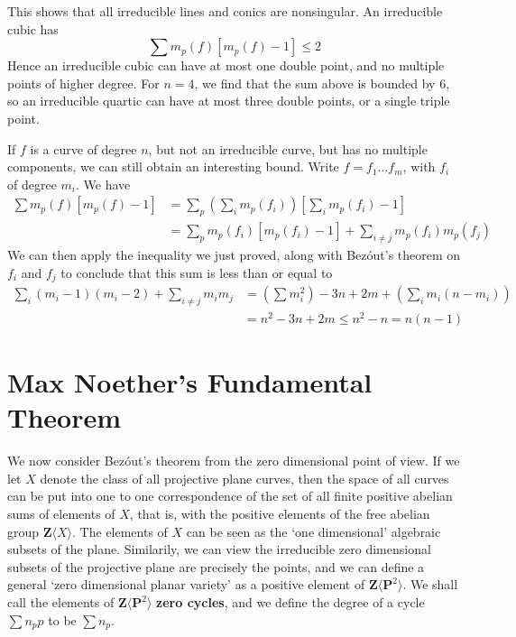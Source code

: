 This shows that all irreducible lines and conics are nonsingular. An irreducible cubic has
%
\[ \sum m_p(f)[m_p(f) - 1] \leq 2 \]
%
Hence an irreducible cubic can have at most one double point, and no multiple points of higher degree. For $n = 4$, we find that the sum above is bounded by $6$, so an irreducible quartic can have at most three double points, or a single triple point.

If $f$ is a curve of degree $n$, but not an irreducible curve, but has no multiple components, we can still obtain an interesting bound. Write $f = f_1 \dots f_m$, with $f_i$ of degree $m_i$. We have
%
\begin{align*}
    \sum m_p(f)[m_p(f) - 1] &= \sum_p \left( \sum_i m_p(f_i) \right) \left[\sum_i m_p(f_i) - 1 \right]\\
    &= \sum_p m_p(f_i)[m_p(f_i) - 1] + \sum_{i \neq j} m_p(f_i)m_p(f_j)
\end{align*}
%
We can then apply the inequality we just proved, along with Bez\'{o}ut's theorem on $f_i$ and $f_j$ to conclude that this sum is less than or equal to
%
\begin{align*}
    \sum_i (m_i - 1)(m_i - 2) + \sum_{i \neq j} m_im_j &= \left( \sum m_i^2 \right) - 3n + 2m + \left( \sum_i m_i(n-m_i) \right)\\
    &= n^2 - 3n + 2m \leq n^2 - n = n(n-1)
\end{align*}

\section{Max Noether's Fundamental Theorem}

We now consider Bez\'{o}ut's theorem from the zero dimensional point of view. If we let $X$ denote the class of all projective plane curves, then the space of all curves can be put into one to one correspondence of the set of all finite positive abelian sums of elements of $X$, that is, with the positive elements of the free abelian group $\mathbf{Z}\langle X \rangle$. The elements of $X$ can be seen as the `one dimensional' algebraic subsets of the plane. Similarily, we can view the irreducible zero dimensional subsets of the projective plane are precisely the points, and we can define a general `zero dimensional planar variety' as a positive element of $\mathbf{Z} \langle \mathbf{P}^2 \rangle$. We shall call the elements of $\mathbf{Z} \langle \mathbf{P}^2 \rangle$ {\bf zero cycles}, and we define the degree of a cycle $\sum n_p p$ to be $\sum n_p$.

